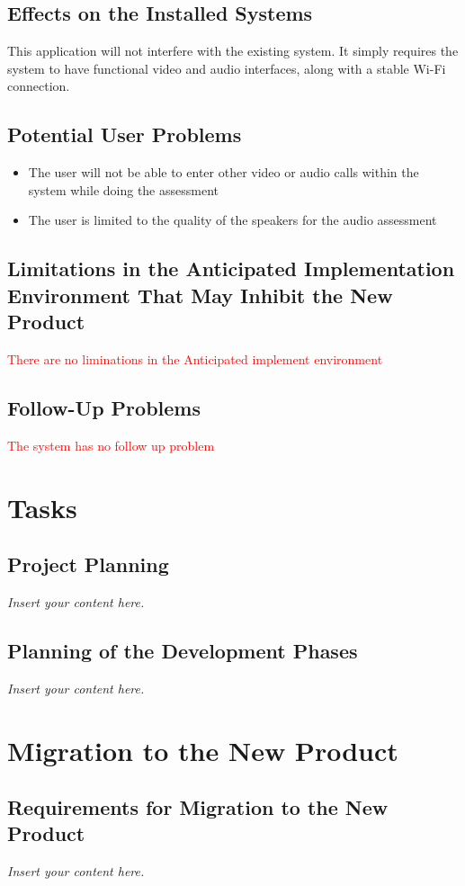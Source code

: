 \documentclass[12pt]{article}
\newcommand{\lips}{\textit{Insert your content here.}}
\begin{document}
\subsection{Effects on the Installed Systems}
\hspace{2em}This application will not interfere with the existing system. It simply requires the system to have functional video and audio interfaces, along with a stable Wi-Fi connection.
\subsection{Potential User Problems}
\begin{itemize}
  \item The user will not be able to enter other video or audio calls within the system while doing the assessment
  \item The user is limited to the quality of the speakers for the audio assessment
\end{itemize}
\subsection{Limitations in the Anticipated Implementation Environment That May
Inhibit the New Product}
\textcolor{red}{There are no liminations in the Anticipated implement environment}
\subsection{Follow-Up Problems}
\textcolor{red}{The system has no follow up problem}
\section{Tasks}
\subsection{Project Planning}
\lips
\subsection{Planning of the Development Phases}
\lips

\section{Migration to the New Product}
\subsection{Requirements for Migration to the New Product}
\lips
\end{document}
